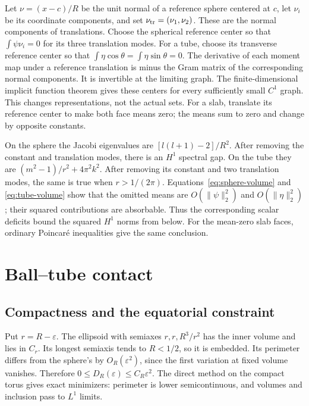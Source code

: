 \documentclass[11pt,reqno]{amsart}
\numberwithin{equation}{section}
\theoremstyle{definition}
\theoremstyle{remark}
\newcommand{\eps}{\varepsilon}
\begin{document}
Let $\nu=(x-c)/R$ be the unit normal of a reference sphere centered at
$c$, let $\nu_i$ be its coordinate components, and set
$\nu_{\rm tr}=(\nu_1,\nu_2)$. These are the normal components of
translations. Choose the spherical reference center so that
$\int\psi\nu_i=0$ for its three translation modes. For a tube,
choose its transverse reference center so that
$\int\eta\cos\theta=\int\eta\sin\theta=0$.
The derivative of each moment map under a reference translation is
minus the Gram matrix of the corresponding normal components. It is
invertible at the limiting graph. The finite-dimensional implicit
function theorem gives these centers for every sufficiently small
$C^1$ graph. This changes representations, not the actual sets.
For a slab, translate its reference center to make both face means zero;
the means sum to zero and change by opposite constants.

On the sphere the Jacobi eigenvalues are $[l(l+1)-2]/R^2$.
After removing the constant and translation modes, there is an $H^1$
spectral gap. On the tube they are
$(m^2-1)/r^2+4\pi^2k^2$.
After removing its constant and two translation modes, the same is true
when $r>1/(2\pi)$. Equations~\eqref{eq:sphere-volume} and
\eqref{eq:tube-volume} show that the omitted means are
$O(\|\psi\|_2^2)$ and $O(\|\eta\|_2^2)$; their squared contributions
are absorbable. Thus the corresponding scalar deficits bound the
squared $H^1$ norms from below. For the mean-zero slab faces, ordinary
Poincar\'e inequalities give the same conclusion.

\section{Ball--tube contact}
\subsection{Compactness and the equatorial constraint}
Put $r=R-\eps$. The ellipsoid with semiaxes $r,r,R^3/r^2$ has the
inner volume and lies in $C_r$. Its longest semiaxis tends to $R<1/2$,
so it is embedded. Its perimeter differs from the sphere's by
$O_R(\eps^2)$, since the first variation at fixed volume vanishes.
Therefore $0\le D_R(\eps)\le C_R\eps^2$.
The direct method on the compact torus gives exact minimizers:
perimeter is lower semicontinuous, and volumes and inclusion pass to
$L^1$ limits.
\end{document}
